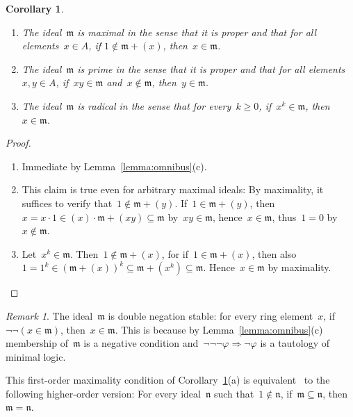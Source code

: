 \documentclass[com,11pt,crcready]{iosart2x}
\theoremstyle{definition}
\theoremstyle{plain}
\newtheorem{corollary}[definition]{Corollary}
\theoremstyle{remark}
\newtheorem{remark}[definition]{Remark}
\newcommand{\mmm}{\mathfrak{m}}
\newcommand{\nnn}{\mathfrak{n}}
\renewcommand{\_}{\mathpunct{.}\,}
\begin{document}
\begin{corollary}\label{cor:is-prime-max}
\begin{enumerate}
\item[\textnormal{(a)}] The ideal~$\mmm$ is \emph{maximal} in the sense that it is proper and that for
all elements~$x \in A$, if $1 \not\in \mmm + (x)$, then~$x \in \mmm$.
\item[\textnormal{(b)}] The ideal~$\mmm$ is \emph{prime} in the
sense that it is proper and that for
all elements~$x,y \in A$, if~$xy \in \mmm$ and~$x \not\in \mmm$, then~$y \in
\mmm$.
\item[\textnormal{(c)}] The ideal~$\mmm$ is \emph{radical} in the sense that for every~$k \geq 0$, if~$x^k \in
\mmm$, then~$x \in \mmm$.
\end{enumerate}
\end{corollary}

\begin{proof}\begin{enumerate}
\item[(a)] Immediate by Lemma~\ref{lemma:omnibus}(c).
\item[(b)] This claim is true even for arbitrary maximal ideals: By maximality, it suffices to verify that~$1 \not\in
\mmm + (y)$. If~$1 \in \mmm + (y)$, then~$x = x\cdot1 \in (x) \cdot \mmm + (xy)
\subseteq \mmm$ by~$xy \in \mmm$, hence~$x \in \mmm$, thus~$1 = 0$ by~$x \not\in
\mmm$.
\item[(c)] Let~$x^k \in \mmm$. Then~$1 \not\in \mmm + (x)$, for if~$1 \in
\mmm + (x)$, then also~$1 = 1^k \in (\mmm + (x))^k \subseteq \mmm + (x^k)
\subseteq \mmm$. Hence~$x \in \mmm$ by maximality.\qedhere
\end{enumerate}
\end{proof}

\begin{remark}The ideal~$\mmm$ is double negation stable: for every
ring element~$x$, if~$\neg\neg(x \in \mmm)$, then~$x \in \mmm$. This is because
by Lemma~\ref{lemma:omnibus}(c) membership of~$\mmm$ is a negative condition
and~$\neg\neg\neg\varphi \Rightarrow \neg\varphi$ is a tautology of minimal
logic.\end{remark}

This first-order maximality condition of Corollary~\ref{cor:is-prime-max}(a) is
equivalent~\cite{berardi-valentini:krivine} to the following higher-order version: For every ideal~$\nnn$ such that~$1
\not\in \nnn$, if~$\mmm \subseteq \nnn$, then~$\mmm = \nnn$.
\end{document}
